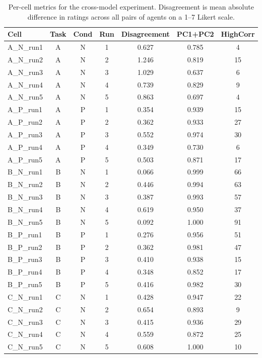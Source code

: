 \begin{table}[t]
\centering
\caption{Per-cell metrics for the cross-model experiment. Disagreement is mean absolute difference in ratings across all pairs of agents on a 1--7 Likert scale.}
\label{tab:per_cell}
\small
\begin{tabular}{lcccccc}
\toprule
Cell & Task & Cond & Run & Disagreement & PC1+PC2 & HighCorr \\
\midrule
A\_N\_run1 & A & N & 1 & 0.627 & 0.785 & 4 \\
A\_N\_run2 & A & N & 2 & 1.246 & 0.819 & 15 \\
A\_N\_run3 & A & N & 3 & 1.029 & 0.637 & 6 \\
A\_N\_run4 & A & N & 4 & 0.739 & 0.829 & 9 \\
A\_N\_run5 & A & N & 5 & 0.863 & 0.697 & 4 \\
A\_P\_run1 & A & P & 1 & 0.354 & 0.939 & 15 \\
A\_P\_run2 & A & P & 2 & 0.362 & 0.933 & 27 \\
A\_P\_run3 & A & P & 3 & 0.552 & 0.974 & 30 \\
A\_P\_run4 & A & P & 4 & 0.349 & 0.730 & 6 \\
A\_P\_run5 & A & P & 5 & 0.503 & 0.871 & 17 \\
B\_N\_run1 & B & N & 1 & 0.066 & 0.999 & 66 \\
B\_N\_run2 & B & N & 2 & 0.446 & 0.994 & 63 \\
B\_N\_run3 & B & N & 3 & 0.387 & 0.993 & 57 \\
B\_N\_run4 & B & N & 4 & 0.619 & 0.950 & 37 \\
B\_N\_run5 & B & N & 5 & 0.092 & 1.000 & 91 \\
B\_P\_run1 & B & P & 1 & 0.276 & 0.956 & 51 \\
B\_P\_run2 & B & P & 2 & 0.362 & 0.981 & 47 \\
B\_P\_run3 & B & P & 3 & 0.410 & 0.938 & 15 \\
B\_P\_run4 & B & P & 4 & 0.348 & 0.852 & 17 \\
B\_P\_run5 & B & P & 5 & 0.416 & 0.982 & 30 \\
C\_N\_run1 & C & N & 1 & 0.428 & 0.947 & 22 \\
C\_N\_run2 & C & N & 2 & 0.654 & 0.893 & 9 \\
C\_N\_run3 & C & N & 3 & 0.415 & 0.936 & 29 \\
C\_N\_run4 & C & N & 4 & 0.559 & 0.872 & 25 \\
C\_N\_run5 & C & N & 5 & 0.608 & 1.000 & 10 \\

\end{tabular}
\end{table}

